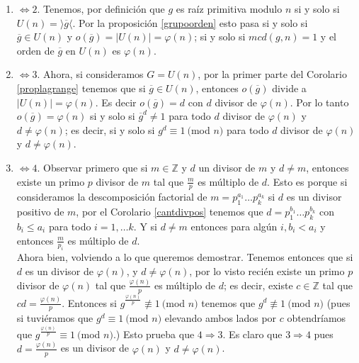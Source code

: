 \documentclass{report}
\begin{document}
\begin{myproof}
    \begin{enumerate}
        \item $\Leftrightarrow 2.$ Tenemos, por definición que $g$ es raíz primitiva modulo $n$ si y solo si $U(n)=\rangle\overline{g}\langle$. Por la proposición \ref{grupoorden} esto pasa si y solo si $\overline{g}\in U(n)$ y $o(\overline{g})=|U(n)|=\varphi(n)$; si y solo si $mcd(g,n)=1$ y el orden de $\overline{g}$ en $U(n)$ es $\varphi(n)$.
        \item $\Leftrightarrow 3.$ Ahora, si consideramos $G=U(n)$, por la primer parte del Corolario \ref{proplagrange} tenemos que si $\overline{g}\in U(n)$, entonces $o(\overline{g})$ divide a $|U(n)|=\varphi(n)$. Es decir $o(\overline{g})=d$ con $d$ divisor de $\varphi(n)$. Por lo tanto $o(\overline{g})=\varphi(n)$ si y solo si $\overline{g}^d\neq 1$ para todo $d$ divisor de $\varphi(n)$ y $d\neq\varphi(n)$; es decir, si y solo si $g^d\equiv 1\ ($mod $n)$ para todo $d$ divisor de $\varphi(n)$ y $d\neq\varphi(n)$.
        \item $\Leftrightarrow 4.$ Observar primero que si $m\in\mathbb{Z}$ y $d$ un divisor de $m$ y $d\neq m$, entonces existe un primo $p$ divisor de $m$ tal que $\frac{m}{p}$ es múltiplo de $d$. Esto es porque si consideramos la descomposición factorial de $m=p_1^{a_1}\dots p_k^{a_k}$ si $d$ es un divisor positivo de $m$, por el Corolario \ref{cantdivpos} tenemos que $d=p_1^{b_1}\dots p_k^{b_k}$ con $b_i\le a_i$ para todo $i=1,\dots k$. Y si $d\neq m$ entonces para algún $i,b_i<a_i$ y entonces $\frac{m}{p_i}$ es múltiplo de $d$.\\
            Ahora bien, volviendo a lo que queremos demostrar. Tenemos entonces que si $d$ es un divisor de $\varphi(n)$, y $d\neq\varphi(n)$, por lo visto recién existe un primo $p$ divisor de $\varphi(n)$ tal que $\frac{\varphi(n)}{p}$ es múltiplo de $d$; es decir, existe $c\in\mathbb{Z}$ tal que $cd=\frac{\varphi(n)}{p}$. Entonces si $g^{\frac{\varphi(n)}{p}}\nequiv 1\ ($mod $n)$ tenemos que $g^d\nequiv 1\ ($mod $n)$ (pues si tuviéramos que $g^d\equiv 1\ ($mod $n)$ elevando ambos lados por $c$ obtendríamos que $g^{\frac{\varphi(n)}{p}}\equiv 1\ ($mod $n)$.) Esto prueba que $4\Rightarrow 3$. Es claro que $3\Rightarrow 4$ pues $d=\frac{\varphi(n)}{p}$ es un divisor de $\varphi(n)$ y $d\neq\varphi(n)$.
    \end{enumerate}
\end{myproof}
\end{document}
